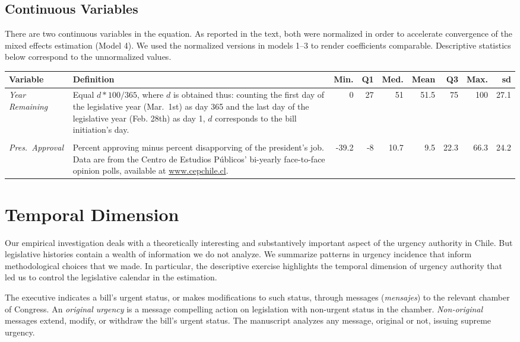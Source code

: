 \documentclass[letter,12pt]{article}
\begin{document}
\subsection{Continuous Variables}

There are two continuous variables in the equation. As reported in the text, both were normalized in order to accelerate convergence of the mixed effects estimation (Model 4). We used the normalized versions in models 1--3 to render coefficients comparable. Descriptive statistics below correspond to the unnormalized values.

\begin{footnotesize}
\singlespacing
\begin{tabularx}{\textwidth}{lXrrrrrrr} %
          Variable  & Definition &  Min.&  Q1 & Med. & Mean &  Q3  &  Max. &   sd \\ [.5ex] \hline
\emph{Year Remaining}& Equal $d*100/365$, where $d$ is obtained thus: counting the first day of the legislative year (Mar.\ 1st) as day 365 and the last day of the legislative year (Feb. 28th) as day 1, $d$ corresponds to the bill initiation's day.     &  0   &  27 & 51   & 51.5 & 75   & 100   &   27.1 \\ [.5ex]
\\ [-1ex]
\emph{Pres.~Approval}& Percent approving minus percent disapporving of the president's job. Data are from the Centro de Estudios Públicos' bi-yearly face-to-face opinion polls, available at \url{www.cepchile.cl}. &-39.2 & -8 &  10.7 &  9.5 & 22.3 &  66.3 &   24.2 \\ \hline
\end{tabularx}
\doublespacing
\end{footnotesize}
  
  \section{Temporal Dimension}\label{s:temp-dim}

Our empirical investigation deals with a theoretically interesting and substantively important aspect of the urgency authority in Chile. But legislative histories contain a wealth of information we do not analyze. We summarize patterns in urgency incidence that inform methodological choices that we made. In particular, the descriptive exercise highlights the temporal dimension of urgency authority that led us to control the legislative calendar in the estimation. 

The executive indicates a bill's urgent status, or makes modifications to such status, through messages (\emph{mensajes}) to the relevant chamber of Congress. An \emph{original urgency} is a message compelling action on legislation with non-urgent status in the chamber. \emph{Non-original} messages extend, modify, or withdraw the bill's urgent status. The manuscript analyzes any message, original or not, issuing supreme urgency.
\end{document}
